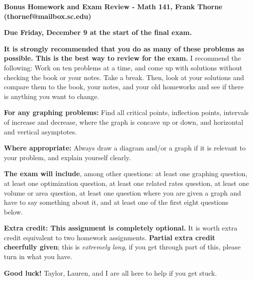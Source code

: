 \documentclass[12pt]{article}
\begin{document}
\setlength{\topmargin}{-2mm}





\begin{center}{\bf Bonus Homework and Exam Review - Math 141, Frank Thorne (thornef@mailbox.sc.edu)}
\end{center}
\begin{center}
{\bf Due Friday, December 9 at the start of the final exam.}
\end{center}

{\bf It is strongly recommended that you do as many of these problems as possible. This is the best
way to review for the exam.} I recommend the following: Work on ten problems at a time, and come up
with solutions without checking the book or your notes. Take a break. Then, look at your solutions
and compare them to the book, your notes, and your old homeworks and see if there is anything you want
to change.

{\bf For any graphing problems:} Find all critical points, inflection points, intervals of increase
and decrease, where the graph is concave up or down, and horizontal and vertical asymptotes.

{\bf Where appropriate:} Always draw a diagram and/or a graph if it is relevant to your problem,
and explain yourself clearly.

{\bf The exam will include}, among other questions: at least one graphing question, at least
one optimization question, at least one related rates question, at least one volume or area
question, at least one question where you are given a graph and have to say something about it,
and at least one of the first eight questions below. 

{\bf Extra credit: This assignment is completely optional.} 
It is worth extra credit equivalent to two homework assignments.
{\bf Partial extra credit cheerfully given}; this is {\itshape extremely long}, 
if you get through part of this, please turn in
what you have.

{\bf Good luck!} Taylor, Lauren, and I are all here to help if you get stuck.
\end{document}
